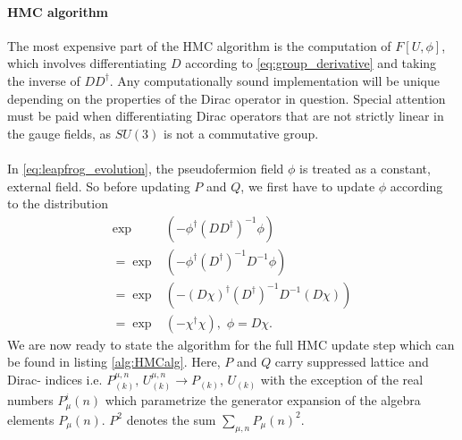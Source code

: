 \documentclass[a4paper,10pt]{book}
\begin{document}
\paragraph{HMC algorithm}The most expensive part of the HMC algorithm is the computation of $F[U, \phi]$, which involves differentiating $D$ according to \eqref{eq:group_derivative} and taking the inverse of $DD^\dagger$. Any computationally sound implementation will be unique depending on the properties of the Dirac operator in question. Special attention must be paid when differentiating Dirac operators that are not strictly linear in the gauge fields, as $SU(3)$ is not a commutative group.\\\\In \eqref{eq:leapfrog_evolution}, the pseudofermion field $\phi$ is treated as a constant, external field. So before updating $P$ and $Q$, we first have to update $\phi$ according to the distribution
\begin{equation}
\begin{aligned} 
 \exp&\left(- \phi^{\dagger}\left(D D^{\dagger}\right)^{-1} \phi \right)
\\ = \exp&\left(- \phi^{\dagger} \left( D^{\dagger} \right)^{-1}D^{-1} \phi \right)\\=  \exp&\left(- \left( D\chi \right)^{\dagger} \left( D^{\dagger} \right)^{-1}D^{-1} \left( D\chi \right) \right)\\ = \exp&\left(- \chi^{\dagger} \chi  \right),\,\,\phi = D\chi.
\end{aligned}
\end{equation}
We are now ready to state the algorithm for the full HMC update step which can be found in listing \ref{alg:HMCalg}. Here, $P$ and $Q$ carry suppressed lattice and Dirac- indices i.e. $P^{\mu,n}_{(k)},\,U^{\mu,n}_{(k)}\rightarrow P_{(k)},\,U_{(k)}$ with the exception of the real numbers $P_{\mu}^{i}(n)$ which parametrize the generator expansion of the algebra elements $P_{\mu}(n)$. $P^2$ denotes the sum $\sum\limits_{\mu,n} P_{\mu}(n)^2$.
\end{document}
